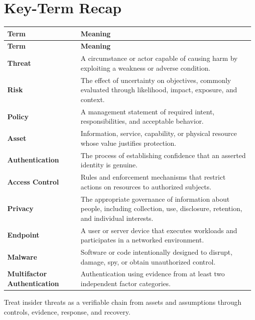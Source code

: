 \documentclass[11pt]{article}
\begin{document}
\section*{Key-Term Recap}
\begin{longtable}{>{\RaggedRight\arraybackslash}p{}>{\RaggedRight\arraybackslash}p{}}
\toprule\rowcolor{Navy}\color{white}\textbf{Term} & \color{white}\textbf{Meaning}\\\midrule
\endfirsthead
\toprule\rowcolor{Navy}\color{white}\textbf{Term} & \color{white}\textbf{Meaning}\\\midrule
\endhead
\textbf{Threat} & A circumstance or actor capable of causing harm by exploiting a weakness or adverse condition. \\\midrule
\textbf{Risk} & The effect of uncertainty on objectives, commonly evaluated through likelihood, impact, exposure, and context. \\\midrule
\textbf{Policy} & A management statement of required intent, responsibilities, and acceptable behavior. \\\midrule
\textbf{Asset} & Information, service, capability, or physical resource whose value justifies protection. \\\midrule
\textbf{Authentication} & The process of establishing confidence that an asserted identity is genuine. \\\midrule
\textbf{Access Control} & Rules and enforcement mechanisms that restrict actions on resources to authorized subjects. \\\midrule
\textbf{Privacy} & The appropriate governance of information about people, including collection, use, disclosure, retention, and individual interests. \\\midrule
\textbf{Endpoint} & A user or server device that executes workloads and participates in a networked environment. \\\midrule
\textbf{Malware} & Software or code intentionally designed to disrupt, damage, spy, or obtain unauthorized control. \\\midrule
\textbf{Multifactor Authentication} & Authentication using evidence from at least two independent factor categories. \\\midrule
\bottomrule
\end{longtable}
\begin{takeawaybox}
Treat insider threats as a verifiable chain from assets and assumptions through controls, evidence, response, and recovery.
\end{takeawaybox}
\end{document}
